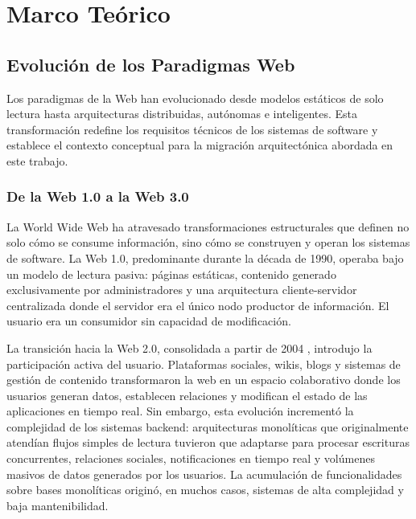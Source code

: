 \chapter{Marco Te\'{o}rico}
\pagestyle{fancy}

\section{Evoluci\'{o}n de los Paradigmas Web}

Los paradigmas de la Web han evolucionado desde modelos est\'{a}ticos de solo
lectura hasta arquitecturas distribuidas, aut\'{o}nomas e inteligentes. Esta
transformaci\'{o}n redefine los requisitos t\'{e}cnicos de los sistemas de software
y establece el contexto conceptual para la migraci\'{o}n arquitect\'{o}nica
abordada en este trabajo.

\subsection{De la Web 1.0 a la Web 3.0}

La World Wide Web ha atravesado transformaciones estructurales que definen no solo c\'{o}mo se consume informaci\'{o}n, sino c\'{o}mo se construyen y operan los sistemas de software. La Web 1.0, predominante durante la d\'{e}cada de 1990, operaba bajo un modelo de lectura pasiva: p\'{a}ginas est\'{a}ticas, contenido generado exclusivamente por administradores y una arquitectura cliente-servidor centralizada donde el servidor era el \'{u}nico nodo productor de informaci\'{o}n. El usuario era un consumidor sin capacidad de modificaci\'{o}n.

La transici\'{o}n hacia la Web 2.0, consolidada a partir de 2004 \cite{oreilly2005web2}, introdujo la participaci\'{o}n activa del usuario. Plataformas sociales, wikis, blogs y sistemas de gesti\'{o}n de contenido transformaron la web en un espacio colaborativo donde los usuarios generan datos, establecen relaciones y modifican el estado de las aplicaciones en tiempo real. Sin embargo, esta evoluci\'{o}n increment\'{o} la complejidad de los sistemas backend: arquitecturas monol\'{i}ticas que originalmente atend\'{i}an flujos simples de lectura tuvieron que adaptarse para procesar escrituras concurrentes, relaciones sociales, notificaciones en tiempo real y vol\'{u}menes masivos de datos generados por los usuarios. La acumulaci\'{o}n de funcionalidades sobre bases monol\'{i}ticas origin\'{o}, en muchos casos, sistemas de alta complejidad y baja mantenibilidad.

